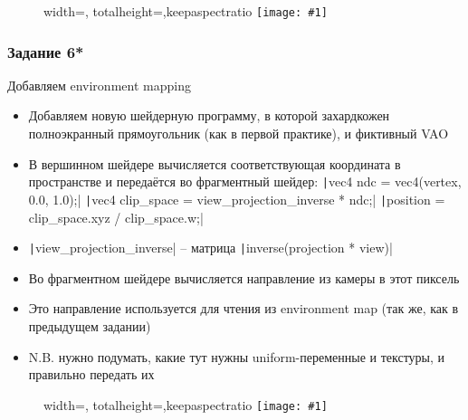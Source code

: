 \documentclass[10pt]{beamer}
\newcommand{\slideimage}[1]{
  \begin{figure}
    \begin{adjustbox}{width=\textwidth, totalheight=\textheight-2\baselineskip-2\baselineskip,keepaspectratio}
      \texttt{[image: \#1]}
    \end{adjustbox}
  \end{figure}
}
\begin{document}
\begin{frame}[fragile]
\slideimage{5.png}
\end{frame}

\begin{frame}[fragile]
\frametitle{Задание 6*}
\begin{footnotesize}
Добавляем environment mapping
\begin{itemize}
\item Добавляем новую шейдерную программу, в которой захардкожен полноэкранный прямоугольник (как в первой практике), и фиктивный VAO
\item В вершинном шейдере вычисляется соответствующая координата в пространстве и передаётся во фрагментный шейдер:
\texttt|vec4 ndc = vec4(vertex, 0.0, 1.0);|
\texttt|vec4 clip_space = view_projection_inverse * ndc;|
\texttt|position = clip_space.xyz / clip_space.w;|
\item \texttt|view_projection_inverse| -- матрица \texttt|inverse(projection * view)|
\item Во фрагментном шейдере вычисляется направление из камеры в этот пиксель
\item Это направление используется для чтения из environment map (так же, как в предыдущем задании)
\item N.B. нужно подумать, какие тут нужны uniform-переменные и текстуры, и правильно передать их
\end{itemize}
\end{footnotesize}
\end{frame}

\begin{frame}[fragile]
\slideimage{6.png}
\end{frame}
\end{document}
